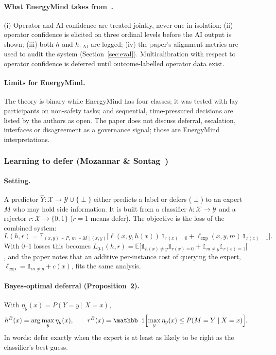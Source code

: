 \documentclass[11pt,a4paper]{article}
\renewcommand{\_}{\textunderscore\allowbreak}
\begin{document}
\paragraph{What EnergyMind takes from~\cite{benz}.} (i) Operator and AI confidence are treated jointly, never
one in isolation; (ii) operator confidence is elicited on three ordinal levels before the AI output is shown;
(iii) both $h$ and $h_{+\mathrm{AI}}$ are logged; (iv) the paper's alignment metrics are used to audit the
system (Section~\ref{sec:eval}). Multicalibration with respect to operator confidence is deferred until
outcome-labelled operator data exist.

\paragraph{Limits for EnergyMind.} The theory is binary while EnergyMind has four classes; it was tested with
lay participants on non-safety tasks; and sequential, time-pressured decisions are listed by the authors as
open. The paper does not discuss deferral, escalation, interfaces or disagreement as a governance signal; those
are EnergyMind interpretations.

\subsubsection{Learning to defer (Mozannar \& Sontag~\cite{mozannar})}
\paragraph{Setting.} A predictor $\hat Y: \mathcal X\to\mathcal Y\cup\{\perp\}$ either predicts a label or
defers ($\perp$) to an expert $M$ who may hold side information. It is built from a classifier
$h:\mathcal X\to\mathcal Y$ and a rejector $r:\mathcal X\to\{0,1\}$ ($r=1$ means defer). The objective is the
loss of the combined system:
\begin{equation}
L(h,r)=\mathbb E_{(x,y)\sim P,\ m\sim M\mid(x,y)}\bigl[\ell(x,y,h(x))\,\mathbb 1_{r(x)=0}+\ell_{\exp}(x,y,m)\,\mathbb 1_{r(x)=1}\bigr].
\end{equation}
With 0--1 losses this becomes $L_{0\text{-}1}(h,r)=\mathbb E\bigl[\mathbb 1_{h(x)\ne y}\mathbb 1_{r(x)=0}+\mathbb 1_{m\ne y}\mathbb 1_{r(x)=1}\bigr]$,
and the paper notes that an additive per-instance cost of querying the expert, $\ell_{\exp}=\mathbb 1_{m\ne y}+c(x)$,
fits the same analysis.

\paragraph{Bayes-optimal deferral (Proposition~2).} With $\eta_y(x)=P(Y=y\mid X=x)$,
\begin{equation}
h^B(x)=\arg\max_y\eta_y(x),\qquad r^B(x)=\mathbb 1\Bigl[\max_y\eta_y(x)\le P(M=Y\mid X=x)\Bigr].
\end{equation}
In words: defer exactly when the expert is at least as likely to be right as the classifier's best guess.
\end{document}
